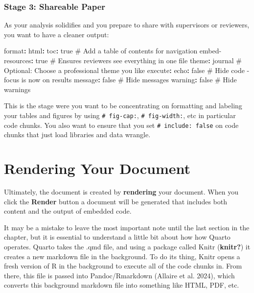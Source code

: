 \documentclass[
  letterpaper,
]{book}
\newenvironment{Shaded}{\begin{snugshade}}{\end{snugshade}}
\newcommand{\AttributeTok}[1]{\textcolor[rgb]{0.40,0.45,0.13}{#1}}
\newcommand{\CharTok}[1]{\textcolor[rgb]{0.13,0.47,0.30}{#1}}
\newcommand{\CommentTok}[1]{\textcolor[rgb]{0.37,0.37,0.37}{#1}}
\newcommand{\FunctionTok}[1]{\textcolor[rgb]{0.28,0.35,0.67}{#1}}
\newcommand{\KeywordTok}[1]{\textcolor[rgb]{0.00,0.23,0.31}{\textbf{#1}}}
\begin{document}
\subsubsection{Stage 3: Shareable Paper}\label{stage-3-shareable-paper}

As your analysis solidifies and you prepare to share with supervisors or
reviewers, you want to have a cleaner output:

\begin{Shaded}
\begin{Highlighting}[]
\FunctionTok{format}\KeywordTok{:}
\AttributeTok{  }\FunctionTok{html}\KeywordTok{:}
\AttributeTok{    }\FunctionTok{toc}\KeywordTok{:}\AttributeTok{ }\CharTok{true}\CommentTok{              \# Add a table of contents for navigation}
\AttributeTok{    }\FunctionTok{embed{-}resources}\KeywordTok{:}\AttributeTok{ }\CharTok{true}\CommentTok{  \# Ensures reviewers see everything in one file}
\AttributeTok{    }\FunctionTok{theme}\KeywordTok{:}\AttributeTok{ journal}\CommentTok{         \# Optional: Choose a professional theme you like}
\AttributeTok{    }
\FunctionTok{execute}\KeywordTok{:}
\AttributeTok{  }\FunctionTok{echo}\KeywordTok{:}\AttributeTok{ }\CharTok{false}\CommentTok{              \# Hide code {-} focus is now on results}
\AttributeTok{  }\FunctionTok{message}\KeywordTok{:}\AttributeTok{ }\CharTok{false}\CommentTok{           \# Hide messages}
\AttributeTok{  }\FunctionTok{warning}\KeywordTok{:}\AttributeTok{ }\CharTok{false}\CommentTok{           \# Hide warnings}
\end{Highlighting}
\end{Shaded}

This is the stage were you want to be concentrating on formatting and
labeling your tables and figures by using
\texttt{\#\textbar{}\ fig-cap:}, \texttt{\#\textbar{}\ fig-width:}, etc
in particular code chunks. You also want to ensure that you set
\texttt{\#\textbar{}\ include:\ false} on code chunks that just load
libraries and data wrangle.

\section{Rendering Your Document}\label{rendering-your-document}

Ultimately, the document is created by \textbf{rendering} your document.
When you click the \textbf{Render} button a document will be generated
that includes both content and the output of embedded code.

It may be a mistake to leave the most important note until the last
section in the chapter, but it is essential to understand a little bit
about how how Quarto operates. Quarto takes the .qmd file, and using a
package called Knitr (\textbf{knitr?}) it creates a new markdown file in
the background. To do its thing, Knitr opens a fresh version of R in the
background to execute all of the code chunks in. From there, this file
is passed into Pandoc/Rmarkdown (Allaire et al. 2024), which converts
this background markdown file into something like HTML, PDF, etc.
\end{document}
